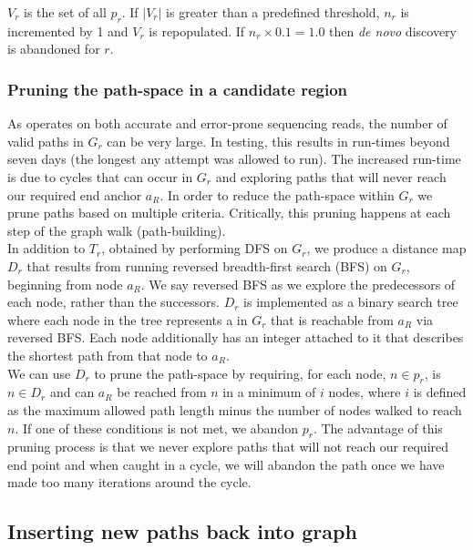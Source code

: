 $V_r$ is the set of all $p_r$. If $|V_r|$ is greater than a predefined threshold, $n_r$ is incremented by 1 and $V_r$ is repopulated. If $n_r \times 0.1 = 1.0$ then \textit{de novo} discovery is abandoned for $r$.

\subsubsection{Pruning the path-space in a candidate region}

As \pandora{} operates on both accurate and error-prone sequencing reads, the number of valid paths in $G_r$ can be very large. In testing, this results in run-times beyond seven days (the longest any attempt was allowed to run). The increased run-time is due to cycles that can occur in $G_r$ and exploring paths that will never reach our required end anchor $a_R$. In order to reduce the path-space within $G_r$ we prune paths based on multiple criteria. Critically, this pruning happens at each step of the graph walk (path-building).\\
In addition to $T_r$, obtained by performing DFS on $G_r$, we produce a distance map $D_r$ that results from running reversed breadth-first search (BFS) on $G_r$, beginning from node $a_R$. We say reversed BFS as we explore the predecessors of each node, rather than the successors. $D_r$ is implemented as a binary search tree where each node in the tree represents a \kmer{} in $G_r$ that is reachable from $a_R$ via reversed BFS. Each node additionally has an integer attached to it that describes the shortest path from that node to $a_R$.\\
We can use $D_r$ to prune the path-space by requiring, for each node, $n \in p_r$, is $n \in D_r$ and can $a_R$ be reached from $n$ in a minimum of $i$ nodes, where $i$ is defined as the maximum allowed path length minus the number of nodes walked to reach $n$. If one of these conditions is not met, we abandon $p_r$. The advantage of this pruning process is that we never explore paths that will not reach our required end point and when caught in a cycle, we will abandon the path once we have made too many iterations around the cycle.

\subsection{Inserting new paths back into graph}
\label{sec:denovo-insert}



